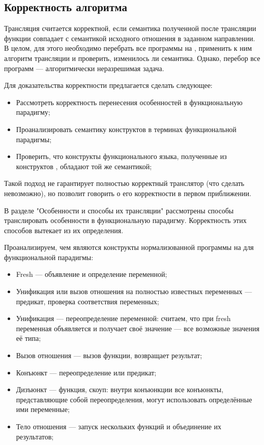 \subsection{Корректность алгоритма}

Трансляция считается корректной, если семантика полученной после трансляции функции совпадает с семантикой исходного отношения в заданном направлении.
В целом, для этого необходимо перебрать все программы на \miniKanren{}, применить к ним алгоритм трансляции и проверить, изменилось ли семантика.
Однако, перебор все программ --- алгоритмически неразрешимая задача.

Для доказательства корректности предлагается сделать следующее:
\begin{itemize}
    \item Рассмотреть корректность перенесения особенностей \miniKanren{} в функциональную парадигму;
    \item Проанализировать семантику конструктов \miniKanren{} в терминах функциональной парадигмы;
    \item Проверить, что конструкты функционального языка, полученные из конструктов \miniKanren{}, обладают той же семантикой;
\end{itemize}

Такой подход не гарантирует полностью корректный транслятор (что сделать невозможно), но позволит говорить о его корректности в первом приближении.

В разделе "Особенности \miniKanren{} и способы их трансляции" рассмотрены способы транслировать особенности \miniKanren{} в функциональную парадигму.
Корректность этих способов вытекает из их определения.

Проанализируем, чем являются конструкты нормализованной программы на \miniKanren{} для функциональной парадигмы:
\begin{itemize}
    \item Fresh --- объявление и определение переменной;
    \item Унификация или вызов отношения на полностью известных переменных --- предикат, проверка соответствия переменных;
    \item Унификация --- переопределение переменной: считаем, что при fresh переменная объявляется и получает своё значение --- все возможные значения её типа;
    \item Вызов отношения --- вызов функции, возвращает результат;
    \item Конъюнкт --- переопределение или предикат;
    \item Дизъюнкт --- функция, скоуп: внутри конъюнкции все конъюнкты, представляющие собой переопределения, могут использовать определённые ими переменные;
    \item Тело отношения --- запуск нескольких функций и объединение их результатов;
\end{itemize}

